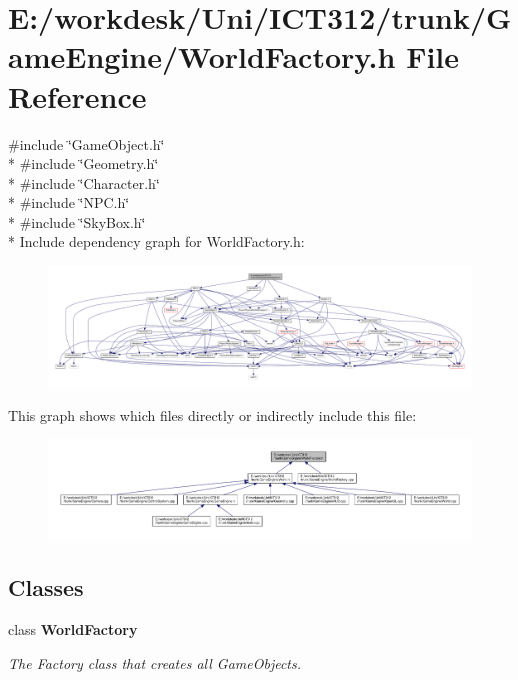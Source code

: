 \section{E\+:/workdesk/\+Uni/\+I\+C\+T312/trunk/\+Game\+Engine/\+World\+Factory.h File Reference}
\label{_world_factory_8h}
{\ttfamily \#include \char`\"{}Game\+Object.\+h\char`\"{}}\\*
{\ttfamily \#include \char`\"{}Geometry.\+h\char`\"{}}\\*
{\ttfamily \#include \char`\"{}Character.\+h\char`\"{}}\\*
{\ttfamily \#include \char`\"{}N\+P\+C.\+h\char`\"{}}\\*
{\ttfamily \#include \char`\"{}Sky\+Box.\+h\char`\"{}}\\*
Include dependency graph for World\+Factory.\+h\+:
\nopagebreak
\begin{figure}[H]
\begin{center}
\leavevmode
\includegraphics[width=350pt]{d4/d61/_world_factory_8h__incl}
\end{center}
\end{figure}
This graph shows which files directly or indirectly include this file\+:\nopagebreak
\begin{figure}[H]
\begin{center}
\leavevmode
\includegraphics[width=350pt]{db/d86/_world_factory_8h__dep__incl}
\end{center}
\end{figure}
\subsection*{Classes}
\begin{DoxyCompactItemize}
\item 
class {\bf World\+Factory}
\begin{DoxyCompactList}\small\item\em The Factory class that creates all Game\+Objects. \end{DoxyCompactList}\end{DoxyCompactItemize}
